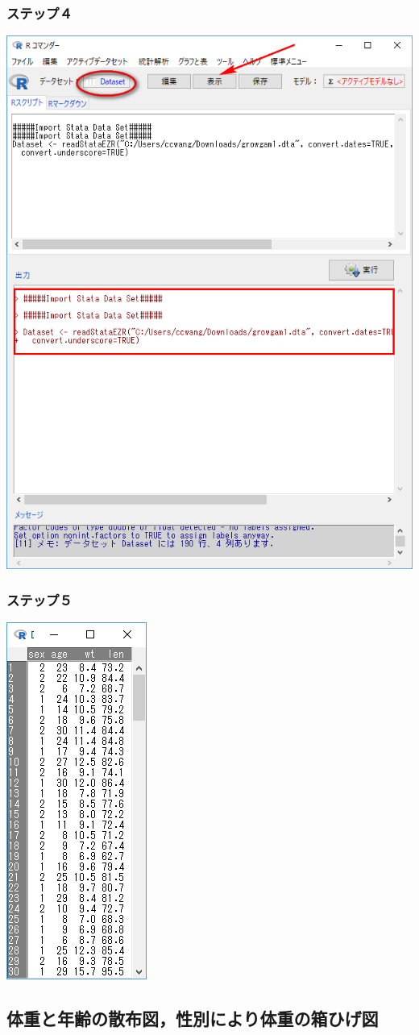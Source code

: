 \documentclass[11pt,]{problemset}
\begin{document}
\subsubsection{ステップ４}\label{-3}

\begin{center}\includegraphics[width=0.5\linewidth]{pic/import04} \end{center}

\subsubsection{ステップ５}\label{-4}

\begin{center}\includegraphics[width=0.2\linewidth]{pic/import05} \end{center}

\subsection{体重と年齢の散布図，性別により体重の箱ひげ図}
\end{document}
